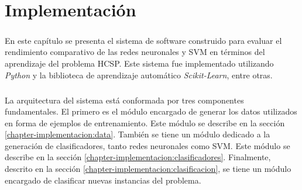 \chapter{Implementación} \label{chapter-implementation}

\paragraph{} En este capítulo se presenta el sistema de software construido para evaluar el rendimiento comparativo de las redes neuronales y SVM en términos del aprendizaje del problema HCSP. Este sistema fue implementado utilizando \textit{Python} y la biblioteca de aprendizaje automático \textit{Scikit-Learn}, entre otras.

\paragraph{} La arquitectura del sistema está conformada por tres componentes fundamentales. El primero es el módulo encargado de generar los datos utilizados en forma de ejemplos de entrenamiento. Este módulo se describe en la sección \ref{chapter-implementacion:data}. También se tiene un módulo dedicado a la generación de clasificadores, tanto redes neuronales como SVM. Este módulo se describe en la sección \ref{chapter-implementacion:clasificadores}. Finalmente, descrito en la sección \ref{chapter-implementacion:clasificacion}, se tiene un módulo encargado de clasificar nuevas instancias del problema.






